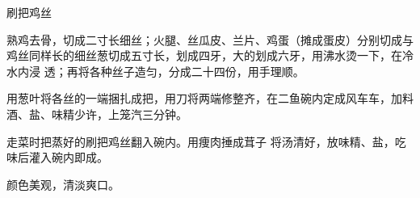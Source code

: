 \begin{recipe}{刷把鸡丝}

\ingredients


\preparation

\step 熟鸡去骨，切成二寸长细丝；火腿、丝瓜皮、兰片、鸡蛋（摊成蛋皮）分别切成与
鸡丝同样长的细丝葱切成五寸长，划成四牙，大的划成六牙，用沸水烫一下，在冷水内浸
透；再将各种丝子造匀，分成二十四份，用手理顺。

\step 用葱叶将各丝的一端捆扎成把，用刀将两端修整齐，在二鱼碗内定成风车车，加料
酒、盐、味精少许，上笼汽三分钟。

\step 走菜时把蒸好的刷把鸡丝翻入碗内。用痩肉捶成茸子 将汤清好，放味精、盐，吃
味后灌入碗内即成。

\features

颜色美观，清淡爽口。

\end{recipe}

